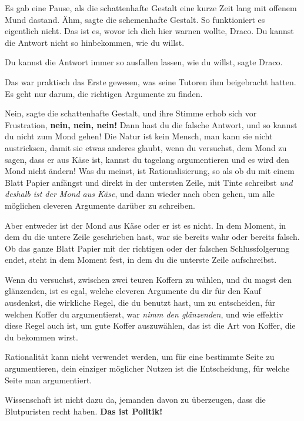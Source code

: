 Es gab eine Pause, als die schattenhafte Gestalt eine kurze Zeit lang mit
offenem Mund dastand. \glqq Ähm\grqq{}, sagte die schemenhafte Gestalt. \glqq
So funktioniert es eigentlich nicht. Das ist es, wovor ich dich hier warnen
wollte, Draco. Du kannst die Antwort nicht so hinbekommen, wie du willst.\grqq{}

\glqq Du kannst die Antwort immer so ausfallen lassen, wie du willst\grqq{},
sagte Draco.

Das war praktisch das Erste gewesen, was seine Tutoren ihm beigebracht hatten.
\glqq Es geht nur darum, die richtigen Argumente zu finden.\grqq{}

\glqq Nein\grqq{}, sagte die schattenhafte Gestalt, und ihre Stimme erhob sich
vor Frustration, \glqq \textbf{nein, nein, nein!} Dann hast du die falsche
Antwort, und so kannst du nicht zum Mond gehen! Die Natur ist kein Mensch, man
kann sie nicht austricksen, damit sie etwas anderes glaubt, wenn du versuchst,
dem Mond zu sagen, dass er aus Käse ist, kannst du tagelang argumentieren und es
wird den Mond nicht ändern! Was du meinst, ist Rationalisierung, so als ob du
mit einem Blatt Papier anfängst und direkt in der untersten Zeile, mit Tinte
schreibst \emph{\glqq und deshalb ist der Mond aus Käse\grqq{}}, und dann
wieder nach oben gehen, um alle möglichen cleveren Argumente darüber zu
schreiben.

Aber entweder ist der Mond aus Käse oder er ist es nicht. In dem Moment, in dem
du die untere Zeile geschrieben hast, war sie bereits wahr oder bereits falsch.
Ob das ganze Blatt Papier mit der richtigen oder der falschen Schlussfolgerung
endet, steht in dem Moment fest, in dem du die unterste Zeile aufschreibst.

Wenn du versuchst, zwischen zwei teuren Koffern zu wählen, und du magst den
glänzenden, ist es egal, welche cleveren Argumente du dir für den Kauf
ausdenkst, die wirkliche Regel, die du benutzt hast, um zu entscheiden, für
welchen Koffer du argumentierst, war \emph{\glqq nimm den glänzenden\grqq{}},
und wie effektiv diese Regel auch ist, um gute Koffer auszuwählen, das ist die
Art von Koffer, die du bekommen wirst.

Rationalität kann nicht verwendet werden, um für eine bestimmte Seite zu
argumentieren, dein einziger möglicher Nutzen ist die Entscheidung, für welche
Seite man argumentiert.

Wissenschaft ist nicht dazu da, jemanden davon zu überzeugen, dass die
Blutpuristen recht haben. \textbf{Das ist Politik!}

